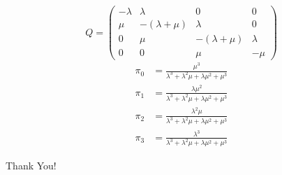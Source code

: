 \documentclass{beamer}
\begin{document}
\begin{frame}
\begin{figure}
  
\end{figure}
\end{frame}


\begin{frame}
\begin{equation*}
  Q = \left(\begin{array}{cccc}
  -\lambda & \lambda & 0 & 0 \\
  \mu & -(\lambda+\mu) & \lambda & 0 \\
  0 & \mu & -(\lambda+\mu) & \lambda \\
  0 & 0 & \mu & -\mu\end{array}\right)
\end{equation*}
\pause
\begin{align*}
\pi_0 &= \frac{\mu^3}{\lambda^3 + \lambda^2\mu + \lambda\mu^2 + \mu^3}\\
\pi_1 &= \frac{\lambda\mu^2}{\lambda^3 + \lambda^2\mu + \lambda\mu^2 + \mu^3}\\
\pi_2 &= \frac{\lambda^2\mu}{\lambda^3 + \lambda^2\mu + \lambda\mu^2 + \mu^3}\\
\pi_3 &= \frac{\lambda^3}{\lambda^3 + \lambda^2\mu + \lambda\mu^2 + \mu^3}
\end{align*}
\end{frame}



\begin{frame}
\begin{center}
\huge Thank You!
\end{center}
\end{frame}
\end{document}
